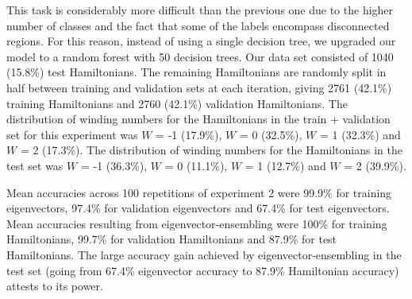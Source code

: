 \documentclass[fleqn,10pt]{wlscirep}
\begin{document}
This task is considerably more difficult than the previous one due to the higher number of classes and the fact that some of the labels encompass disconnected regions. For this reason, instead of using a single decision tree, we upgraded our model to a random forest \cite{Breiman2001} with 50 decision trees. Our data set consisted of 1040 (15.8\%) test Hamiltonians. The remaining Hamiltonians are randomly split in half between training and validation sets at each iteration, giving 2761 (42.1\%) training Hamiltonians and 2760 (42.1\%) validation Hamiltonians. The distribution of winding numbers for the Hamiltonians in the train + validation set for this experiment was $W$ = -1 (17.9\%), $W$ = 0 (32.5\%), $W$ = 1 (32.3\%) and $W$ = 2 (17.3\%). The distribution of winding numbers for the Hamiltonians in the test set was $W$ = -1 (36.3\%), $W$ = 0 (11.1\%), $W$ = 1 (12.7\%) and $W$ = 2 (39.9\%).

Mean accuracies across 100 repetitions of experiment 2 were 99.9\% for training eigenvectors, 97.4\% for validation eigenvectors and 67.4\% for test eigenvectors. Mean accuracies resulting from eigenvector-ensembling were 100\% for training Hamiltonians, 99.7\% for validation Hamiltonians and 87.9\% for test Hamiltonians. The large accuracy gain achieved by eigenvector-ensembling in the test set (going from 67.4\% eigenvector accuracy to 87.9\% Hamiltonian accuracy) attests to its power.
\end{document}
